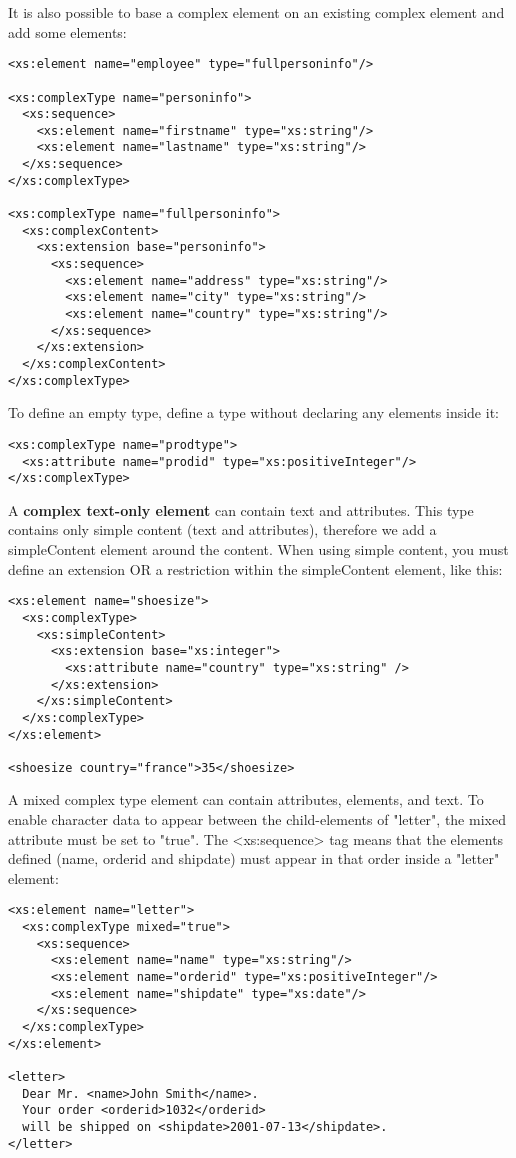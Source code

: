 \documentclass[11pt]{article}
\begin{document}
It is also possible to base a complex element on an existing complex element and add some elements:
\lstset{breaklines=true,language=XML,label= ,caption= ,captionpos=b,numbers=none}
\begin{lstlisting}
<xs:element name="employee" type="fullpersoninfo"/>

<xs:complexType name="personinfo">
  <xs:sequence>
    <xs:element name="firstname" type="xs:string"/>
    <xs:element name="lastname" type="xs:string"/>
  </xs:sequence>
</xs:complexType>

<xs:complexType name="fullpersoninfo">
  <xs:complexContent>
    <xs:extension base="personinfo">
      <xs:sequence>
        <xs:element name="address" type="xs:string"/>
        <xs:element name="city" type="xs:string"/>
        <xs:element name="country" type="xs:string"/>
      </xs:sequence>
    </xs:extension>
  </xs:complexContent>
</xs:complexType>
\end{lstlisting}

To define an empty type, define a type without declaring any elements inside it:
\lstset{breaklines=true,language=XML,label= ,caption= ,captionpos=b,numbers=none}
\begin{lstlisting}
<xs:complexType name="prodtype">
  <xs:attribute name="prodid" type="xs:positiveInteger"/>
</xs:complexType>
\end{lstlisting}

A \textbf{complex text-only element} can contain text and attributes. This type contains only simple content (text and attributes), therefore we add a simpleContent element around the content. When using simple content, you must define an extension OR a restriction within the simpleContent element, like this:
\lstset{breaklines=true,language=XML,label= ,caption= ,captionpos=b,numbers=none}
\begin{lstlisting}
<xs:element name="shoesize">
  <xs:complexType>
    <xs:simpleContent>
      <xs:extension base="xs:integer">
        <xs:attribute name="country" type="xs:string" />
      </xs:extension>
    </xs:simpleContent>
  </xs:complexType>
</xs:element>

<shoesize country="france">35</shoesize>
\end{lstlisting}

A mixed complex type element can contain attributes, elements, and text. To enable character data to appear between the child-elements of "letter", the mixed attribute must be set to "true". The <xs:sequence> tag means that the elements defined (name, orderid and shipdate) must appear in that order inside a "letter" element:
\lstset{breaklines=true,language=XML,label= ,caption= ,captionpos=b,numbers=none}
\begin{lstlisting}
<xs:element name="letter">
  <xs:complexType mixed="true">
    <xs:sequence>
      <xs:element name="name" type="xs:string"/>
      <xs:element name="orderid" type="xs:positiveInteger"/>
      <xs:element name="shipdate" type="xs:date"/>
    </xs:sequence>
  </xs:complexType>
</xs:element>

<letter>
  Dear Mr. <name>John Smith</name>.
  Your order <orderid>1032</orderid>
  will be shipped on <shipdate>2001-07-13</shipdate>.
</letter>
\end{lstlisting}
\end{document}
